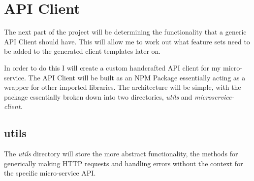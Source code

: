 \section{API Client}
The next part of the project will be determining the functionality that a generic API Client should have. This will allow me to work out what feature sets need to be added to the generated client templates later on. 

In order to do this I will create a custom handcrafted API client for my micro-service. The API Client will be built as an NPM Package essentially acting as a wrapper for other imported libraries. The architecture will be simple, with the package essentially broken down into two directories, \emph{utils} and \emph{microservice-client}.
\subsection{utils}
The \emph{utils} directory will store the more abstract functionality, the methods for generically making HTTP requests and handling errors without the context for the specific micro-service API.
